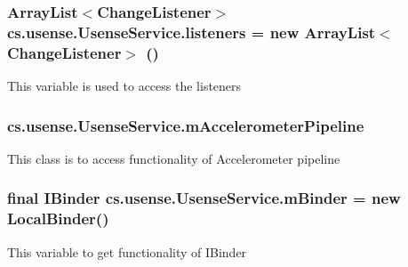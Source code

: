 \subsubsection[{listeners}]{\setlength{\rightskip}{0pt plus 5cm}Array\+List$<${\bf Change\+Listener}$>$ cs.\+usense.\+Usense\+Service.\+listeners = new Array\+List$<${\bf Change\+Listener}$>$ ()\hspace{0.3cm}{\ttfamily [private]}}\label{classcs_1_1usense_1_1_usense_service_a71cb28de66ce79c32cc7bb9cf8299c1a}
This variable is used to access the listeners \hypertarget{classcs_1_1usense_1_1_usense_service_a8a34b51ec2f7731dee62e886cd50dffe}{}
\subsubsection[{m\+Accelerometer\+Pipeline}]{ cs.\+usense.\+Usense\+Service.\+m\+Accelerometer\+Pipeline\hspace{0.3cm}{\ttfamily [private]}}\label{classcs_1_1usense_1_1_usense_service_a8a34b51ec2f7731dee62e886cd50dffe}
This class is to access functionality of Accelerometer pipeline \hypertarget{classcs_1_1usense_1_1_usense_service_abfd01552fe63f68304a96a1022f1b550}{}
\subsubsection[{m\+Binder}]{\setlength{\rightskip}{0pt plus 5cm}final I\+Binder cs.\+usense.\+Usense\+Service.\+m\+Binder = new {\bf Local\+Binder}()\hspace{0.3cm}{\ttfamily [private]}}\label{classcs_1_1usense_1_1_usense_service_abfd01552fe63f68304a96a1022f1b550}
This variable to get functionality of I\+Binder \hypertarget{classcs_1_1usense_1_1_usense_service_ad4dd4b6f3a051c8a74ad961b9d49b1a7}{}

